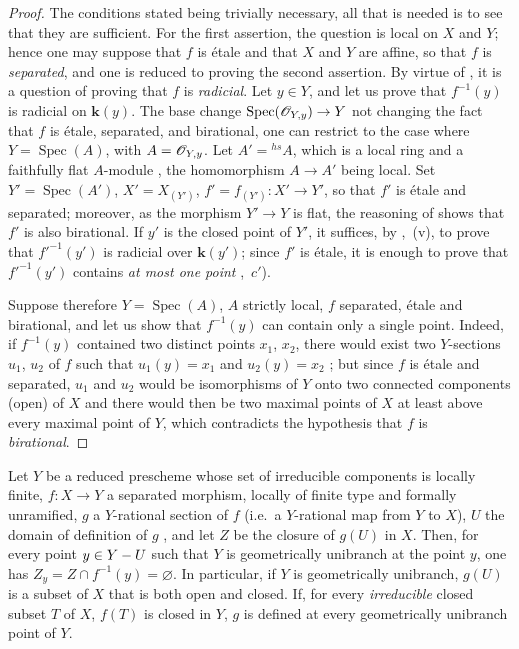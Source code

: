 
\begin{proof}
The conditions stated being trivially necessary, all that is needed is to see that they are sufficient.
For the first assertion, the question is local on $X$ and $Y$; hence one may suppose that $f$ is \'etale and that $X$ and $Y$ are affine, so that $f$ is \emph{separated}, and one is reduced to proving the second assertion.
By virtue of , it is a question of proving that $f$ is \emph{radicial}.
Let $y\in Y$, and let us prove that $f^{-1}(y)$ is radicial on $\boldsymbol{k}(y)$.
The base change $\operatorname{Spec}(\mathscr{O}_{Y,y})\to Y$ not changing the fact that $f$ is \'etale, separated, and birational, one can restrict to the case where $Y=\operatorname{Spec}(A)$, with $A=\mathscr{O}_{Y,y}$.
Let $A'={}^{hs}A$, which is a local ring and a faithfully flat $A$-module , the homomorphism $A\to A'$ being local.
Set $Y'=\operatorname{Spec}(A')$, $X'=X_{(Y')}$, $f'=f_{(Y')}:X'\to Y'$, so that $f'$ is \'etale and separated; moreover, as the morphism $Y'\to Y$ is flat, the reasoning of  shows that $f'$ is also birational.
If $y'$ is the closed point of $Y'$, it suffices, by ,~(v), to prove that $f'^{-1}(y')$ is radicial over $\boldsymbol{k}(y')$; since $f'$ is \'etale, it is enough to prove that $f'^{-1}(y')$ contains \emph{at most one point} ,~$c'$).

Suppose therefore $Y=\operatorname{Spec}(A)$, $A$ strictly local, $f$ separated, \'etale and birational, and let us show that $f^{-1}(y)$ can contain only a single point.
Indeed, if $f^{-1}(y)$ contained two distinct points $x_1$, $x_2$, there would exist two $Y$-sections $u_1$, $u_2$ of $f$ such that $u_1(y)=x_1$ and $u_2(y)=x_2$ ; but since $f$ is \'etale and separated, $u_1$ and $u_2$ would be isomorphisms of $Y$ onto two connected components (open) of $X$  and there would then be two maximal points of $X$ at least above every maximal point of $Y$, which contradicts the hypothesis that $f$ is \emph{birational}.
\end{proof}

\begin{proposition}[18.10.19]
\label{IV.18.10.19}
Let $Y$ be a reduced prescheme whose set of irreducible components is locally finite, $f:X\to Y$ a separated morphism, locally of finite type and formally unramified, $g$ a $Y$-rational section of $f$ \textup{(i.e.}\ a $Y$-rational map from $Y$ to $X$\textup{)}, $U$ the domain of definition of $g$ , and let $Z$ be the closure of $g(U)$ in $X$.
Then, for every point $y\in Y- U$ such that $Y$ is geometrically unibranch at the point $y$, one has $Z_y=Z\cap f^{-1}(y)=\varnothing$.
In particular, if $Y$ is geometrically unibranch, $g(U)$ is a subset of $X$ that is both open and closed.
If, for every \emph{irreducible} closed subset $T$ of $X$, $f(T)$ is closed in $Y$, $g$ is defined at every geometrically unibranch point of $Y$.
\end{proposition}

